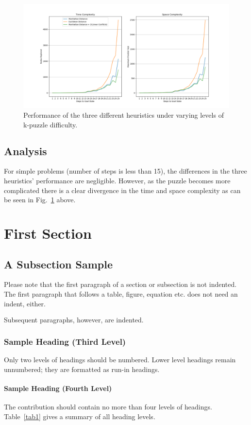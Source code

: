 \documentclass[runningheads]{llncs}
\begin{document}
\begin{figure}
    \includegraphics[width=\textwidth]{fig1.png}
    \caption{Performance of the three different heuristics under varying levels of k-puzzle difficulty.} \label{fig1}
    \end{figure}

\subsection{Analysis}
For simple problems (number of steps is less than 15), the differences in the three heuristics' performance are negligible. However, as the puzzle becomes more complicated there is a clear divergence in the time and space complexity as can be seen in Fig.~\ref{fig1} above.

\section{First Section}
\subsection{A Subsection Sample}
Please note that the first paragraph of a section or subsection is
not indented. The first paragraph that follows a table, figure,
equation etc. does not need an indent, either.

Subsequent paragraphs, however, are indented.

\subsubsection{Sample Heading (Third Level)} Only two levels of
headings should be numbered. Lower level headings remain unnumbered;
they are formatted as run-in headings.

\paragraph{Sample Heading (Fourth Level)}
The contribution should contain no more than four levels of
headings. Table~\ref{tab1} gives a summary of all heading levels.
\end{document}
